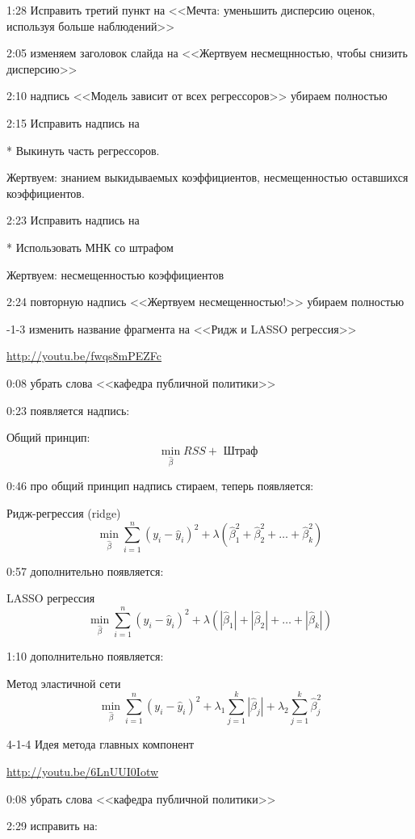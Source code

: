 \documentclass[12pt,a4paper]{article}
\begin{document}
1:28 Исправить третий пункт на <<Мечта: уменьшить дисперсию оценок, используя больше наблюдений>>

2:05 изменяем заголовок слайда на <<Жертвуем несмещнностью, чтобы снизить дисперсию>>

2:10 надпись <<Модель зависит от всех регрессоров>> убираем полностью

2:15 Исправить надпись на 

* Выкинуть часть регрессоров. 

Жертвуем: знанием выкидываемых коэффициентов, несмещенностью оставшихся коэффициентов.

2:23 Исправить надпись на

* Использовать МНК со штрафом

Жертвуем: несмещенностью коэффициентов

2:24 повторную надпись <<Жертвуем несмещенностью!>> убираем полностью


-1-3 изменить название фрагмента на <<Ридж и LASSO регрессия>>

\url{http://youtu.be/fwqs8mPEZFc}

0:08 убрать слова <<кафедра публичной политики>>  

0:23 появляется надпись:

Общий принцип:
\[
\min_{\hat{\beta}} RSS + \text{ Штраф }
\]

0:46 про общий принцип надпись стираем, теперь появляется:

Ридж-регрессия (ridge)
\[
\min_{\hat{\beta}} \sum_{i=1}^n (y_i-\hat{y}_i)^2 + \lambda (\hat{\beta}_1^2 + \hat{\beta}_2^2 + \ldots + \hat{\beta}_k^2)
\]

0:57 дополнительно появляется: 

LASSO регрессия
\[
\min_{\hat{\beta}} \sum_{i=1}^n (y_i-\hat{y}_i)^2 + \lambda (|\hat{\beta}_1| + |\hat{\beta}_2| + \ldots + |\hat{\beta}_k|)
\]

1:10 дополнительно появляется:

Метод эластичной сети
\[
\min_{\hat{\beta}} \sum_{i=1}^n (y_i-\hat{y}_i)^2 + \lambda_1 \sum_{j=1}^k |\hat{\beta}_j| + \lambda_2 \sum_{j=1}^k \hat{\beta}_j^2
\]



4-1-4 Идея метода главных компонент

\url{http://youtu.be/6LnUUI0Iotw}

0:08 убрать слова <<кафедра публичной политики>>  

2:29 исправить на:
\end{document}

